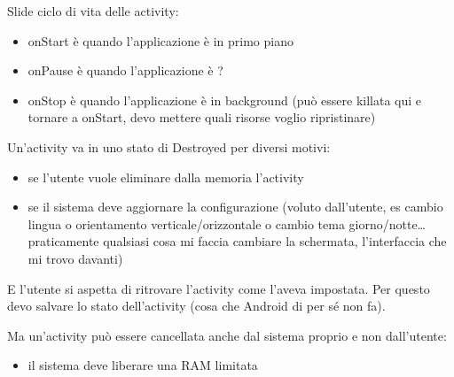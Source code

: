 
\par Slide ciclo di vita delle activity:
\begin{itemize}
    \item onStart è quando l'applicazione è in primo piano
    \item onPause è quando l'applicazione è ?
    \item onStop è quando l'applicazione è in background (può essere killata qui e tornare a onStart, devo mettere quali risorse voglio ripristinare)
\end{itemize}

\par Un'activity va in uno stato di Destroyed per diversi motivi:
\begin{itemize}
    \item se l'utente vuole eliminare dalla memoria l'activity
    \item se il sistema deve aggiornare la configurazione (voluto dall'utente, es cambio lingua o orientamento verticale/orizzontale o cambio tema giorno/notte\dots praticamente qualsiasi cosa mi faccia cambiare la schermata, l'interfaccia che mi trovo davanti)
\end{itemize}
E l'utente si aspetta di ritrovare l'activity come l'aveva impostata. Per questo devo salvare lo stato dell'activity (cosa che Android di per sé non fa).
\par Ma un'activity può essere cancellata anche dal sistema proprio e non dall'utente:
\begin{itemize}
    \item il sistema deve liberare una RAM limitata
\end{itemize}

